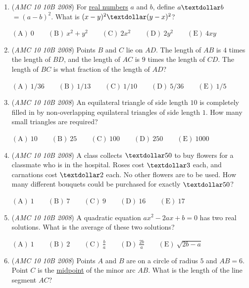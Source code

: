 \begin{enumerate}
 $\mathrm{(A)}\ 270,000\qquad\mathrm{(B)}\ 385,000\qquad\mathrm{(C)}\ 400,000\qquad\mathrm{(D)}\ 430,000\qquad\mathrm{(E)}\ 700,000$


	\item (\textit{AMC 10 10B 2008}) For \href{https://artofproblemsolving.com/wiki/index.php?title=Real\_number}{real numbers} $a$ and $b$, define $a \textdollar b$ $=(a-b)^2$. What is $(x-y)^2\textdollar(y-x)^2$?


 $\mathrm{(A)}\ 0\qquad\mathrm{(B)}\ x^2+y^2\qquad\mathrm{(C)}\ 2x^2\qquad\mathrm{(D)}\ 2y^2\qquad\mathrm{(E)}\ 4xy$


	\item (\textit{AMC 10 10B 2008}) Points $B$ and $C$ lie on $AD$. The length of $AB$ is $4$ times the length of $BD$, and the length of $AC$ is $9$ times the length of $CD$. The length of $BC$ is what fraction of the length of $AD$?


 $\mathrm{(A)}\ 1/36\qquad\mathrm{(B)}\ 1/13\qquad\mathrm{(C)}\ 1/10\qquad\mathrm{(D)}\ 5/36\qquad\mathrm{(E)}\ 1/5$


	\item (\textit{AMC 10 10B 2008}) An equilateral triangle of side length $10$ is completely filled in by non-overlapping equilateral triangles of side length $1$. How many small triangles are required?


 $\mathrm{(A)}\ 10\qquad\mathrm{(B)}\ 25\qquad\mathrm{(C)}\ 100\qquad\mathrm{(D)}\ 250\qquad\mathrm{(E)}\ 1000$


	\item (\textit{AMC 10 10B 2008}) A class collects $\textdollar50$ to buy flowers for a classmate who is in the hospital. Roses cost $\textdollar3$ each, and carnations cost $\textdollar2$ each. No other flowers are to be used. How many different bouquets could be purchased for exactly $\textdollar50$?


 $\mathrm{(A)}\ 1 \qquad \mathrm{(B)}\ 7 \qquad \mathrm{(C)}\ 9 \qquad \mathrm{(D)}\ 16 \qquad \mathrm{(E)}\ 17$


	\item (\textit{AMC 10 10B 2008}) A quadratic equation $ax^2 - 2ax + b = 0$ has two real solutions. What is the average of these two solutions?


 $\mathrm{(A)}\ 1\qquad\mathrm{(B)}\ 2\qquad\mathrm{(C)}\ \frac ba\qquad\mathrm{(D)}\ \frac{2b}a\qquad\mathrm{(E)}\ \sqrt{2b-a}$


	\item (\textit{AMC 10 10B 2008}) Points $A$ and $B$ are on a circle of radius $5$ and $AB=6$. Point $C$ is the \href{https://artofproblemsolving.com/wiki/index.php?title=Midpoint}{midpoint} of the minor arc $AB$. What is the length of the line segment $AC$?



\end{enumerate}
